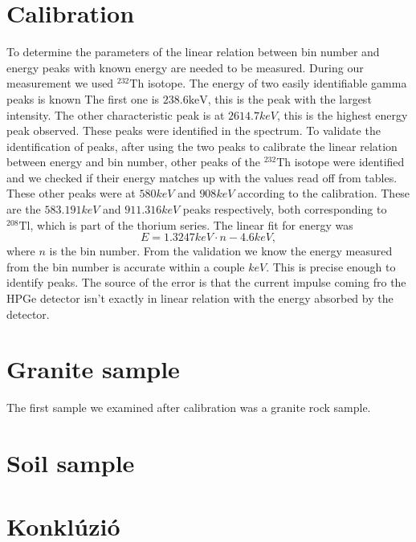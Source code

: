 \documentclass[pdftex,12pt,a4paper]{article}
\begin{document}
	\section{Calibration}
		To determine the parameters of the linear relation between bin number and energy peaks with known energy are needed to be measured. During our measurement we used $^{232}\text{Th}$ isotope. The energy of two easily identifiable gamma peaks is known The first one is $238.6\text{keV}$, this is the peak with the largest intensity. The other characteristic peak is at $2614.7keV$, this is the highest energy peak observed. These peaks were identified in the spectrum. To validate the identification of peaks, after using the two peaks to calibrate the linear relation between energy and bin number, other peaks of the $^{232}\text{Th}$ isotope were identified and we checked if their energy matches up with the values read off from tables. These other peaks were at $580keV$ and $908keV$ according to the calibration. These are the $583.191keV$ and $911.316keV$ peaks respectively, both corresponding to $^{208}\text{Tl}$, which is part of the thorium series. The linear fit for energy was
		\begin{equation}
			E = 1.3247keV \cdot n - 4.6keV,
		\end{equation}
		where $n$ is the bin number. From the validation we know the energy measured from the bin number is accurate within a couple $keV$. This is precise enough to identify peaks. The source of the error is that the current impulse coming fro the HPGe detector isn't exactly in linear relation with the energy absorbed by the detector.
	\section{Granite sample}
		The first sample we examined after calibration was a granite rock sample.
	\section{Soil sample}
	
	
	
	
	\section{Konklúzió}
	
    
\end{document}
